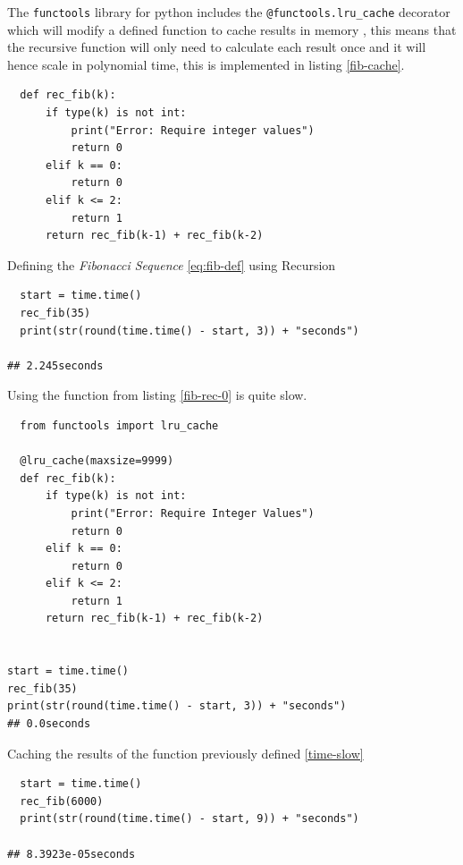 \documentclass[11pt]{article}
\begin{document}
The \texttt{functools} library for python includes the \texttt{@functools.lru\_cache} decorator
which will modify a defined function to cache results in memory
\cite{FunctoolsHigherorderFunctions}, this means that the recursive function will
only need to calculate each result once and it will hence scale in polynomial
time, this is implemented in listing \ref{fib-cache}.


\begin{listing}[htbp]
\begin{verbatim}
  def rec_fib(k):
      if type(k) is not int:
          print("Error: Require integer values")
          return 0
      elif k == 0:
          return 0
      elif k <= 2:
          return 1
      return rec_fib(k-1) + rec_fib(k-2)
\end{verbatim}
\caption{\label{fib-rec-0}Defining the \emph{Fibonacci Sequence} \eqref{eq:fib-def} using Recursion}
\end{listing}

\begin{listing}[htbp]
\begin{verbatim}
  start = time.time()
  rec_fib(35)
  print(str(round(time.time() - start, 3)) + "seconds")

## 2.245seconds
\end{verbatim}
\caption{\label{time-slow}Using the function from listing \ref{fib-rec-0} is quite slow.}
\end{listing}


\begin{listing}[htbp]
\begin{verbatim}
  from functools import lru_cache
 
  @lru_cache(maxsize=9999)
  def rec_fib(k):
      if type(k) is not int:
          print("Error: Require Integer Values")
          return 0
      elif k == 0:
          return 0
      elif k <= 2:
          return 1
      return rec_fib(k-1) + rec_fib(k-2)


start = time.time()
rec_fib(35)
print(str(round(time.time() - start, 3)) + "seconds")
## 0.0seconds
\end{verbatim}
\caption{\label{fib-cache}Caching the results of the function previously defined \ref{time-slow}}
\end{listing}

\begin{verbatim}
  start = time.time()
  rec_fib(6000)
  print(str(round(time.time() - start, 9)) + "seconds")

## 8.3923e-05seconds
\end{verbatim}
\end{document}
